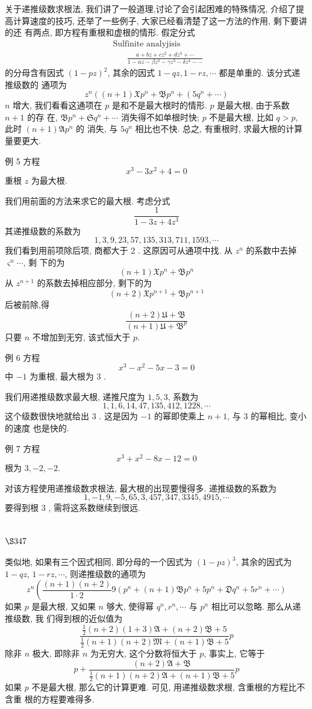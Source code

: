 关于递推级数求根法, 我们讲了一般道理,讨论了会引起困难的特殊情况, 介绍了提 高计算速度的技巧, 还举了一些例子, 大家已经看清楚了这一方法的作用, 剩下要讲的还 有两点, 即方程有重根和虚根的情形. 假定分式 
\[
\begin{gathered}
\text { Sulfinite analyjisis } \\
\qquad \frac{a+b z+c z^{2}+d z^{3}+\cdots}{1-\alpha z-\beta z^{2}-\gamma z^{3}-\delta z^{4}-\cdots}
\end{gathered}
\]
的分母含有因式 $(1-p z)^{2}$, 其余的因式 $1-q z, 1-r z, \cdots$ 都是单重的. 该分式递推级数的 通项为
\[
z^{n}\left((n+1) \mathfrak{X} p^{n}+\mathfrak{B} p^{n}+\left(5 q^{n}+\cdots\right)\right.
\]
$n$ 增大, 我们看看这通项在 $p$ 是和不是最大根时的情形. $p$ 是最大根, 由于系数 $n+1$ 的存 在, $\mathfrak{B} p^{n}+\mathfrak{S} q^{n}+\cdots$ 消失得不如单根时快; $p$ 不是最大根, 比如 $q>p$, 此时 $(n+1) \mathfrak{A} p^{n}$ 的 消失, 与 $\mathfrak{5} q^{n}$ 相比也不快. 总之, 有重根时, 求最大根的计算量要更大.

例 5 方程
\[
x^{3}-3 x^{2}+4=0
\]
重根 $z$ 为最大根.

我们用前面的方法来求它的最大根. 考虑分式
\[
\frac{1}{1-3 z+4 z^{3}}
\]
其递推级数的系数为
\[
1,3,9,23,57,135,313,711,1593, \cdots
\]
我们看到用前项除后项, 商都大于 2 . 这原因可从通项中找. 从 $z^{n}$ 的系数中去掉 $\varsigma^{n} \cdots$, 剩 下的为
\[
(n+1) \mathfrak{X} p^{n}+\mathfrak{B} p^{n}
\]
从 $z^{n+1}$ 的系数去掉相应部分, 剩下的为
\[
(n+2) \mathfrak{X} p^{n+1}+\mathfrak{B} p^{n+1}
\]
后被前除,得
\[
\frac{(n+2) \mathfrak{U}+\mathfrak{B}}{(n+1) \mathfrak{U}+\mathfrak{B}^{p}}
\]
只要 $n$ 不增加到无穷, 该式恒大于 $p$.

例 6 方程
\[
x^{3}-x^{2}-5 x-3=0
\]
中 $-1$ 为重根, 最大根为 3 .

我们用递推级数求最大根, 递推尺度为 $1,5,3$, 系数为
\[
1,1,6,14,47,135,412,1228, \cdots
\]
这个级数很快地就给出 3 . 这是因为 $-1$ 的幂即使乘上 $n+1$, 与 3 的幂相比, 变小的速度 也是快的.

例 7 方程
\[
x^{3}+x^{2}-8 x-12=0
\]
根为 $3,-2,-2$.

对该方程使用递推级数求根法, 最大根的出现要慢得多. 递推级数的系数为
\[
1,-1,9,-5,65,3,457,347,3345,4915, \cdots
\]
要得到根 3 , 需将这系数继续到很远. 

\section{$\S 347$}

类似地, 如果有三个因式相同, 即分母的一个因式为 $(1-p z)^{3}$, 其余的因式为 $1-q z$, $1-r z, \cdots$, 则递推级数的通项为
\[
z^{n}\left(\frac{(n+1)(n+2)}{1 \cdot 2} 9\left(p^{n}+(n+1) \mathfrak{B} p^{n}+5 p^{n}+\mathfrak{D} q^{n}+5 r^{n}+\cdots\right)\right.
\]
如果 $p$ 是最大根, 又如果 $n$ 够大, 使得幂 $q^{n}, r^{n}, \cdots$ 与 $p^{n}$ 相比可以忽略. 那么从递推级数, 我 们得到根的近似值为
\[
\frac{\frac{1}{2}(n+2)(1+3) \mathfrak{A}+(n+2) \mathfrak{B}+\mathfrak{5}}{\frac{1}{2}(n+1)(n+2) \mathfrak{M}+(n+1) \mathfrak{B}+\mathfrak{5}} p
\]
除非 $n$ 极大, 即除非 $n$ 为无穷大, 这个分数将恒大于 $p$, 事实上, 它等于
\[
p+\frac{(n+2) \mathfrak{A}+\mathfrak{B}}{\frac{1}{2}(n+1)(n+2) \mathfrak{A}+(n+1) \mathfrak{B}+\mathfrak{5}} p
\]
如果 $p$ 不是最大根, 那么它的计算更难. 可见, 用递推级数求根, 含重根的方程比不含重 根的方程要难得多.

